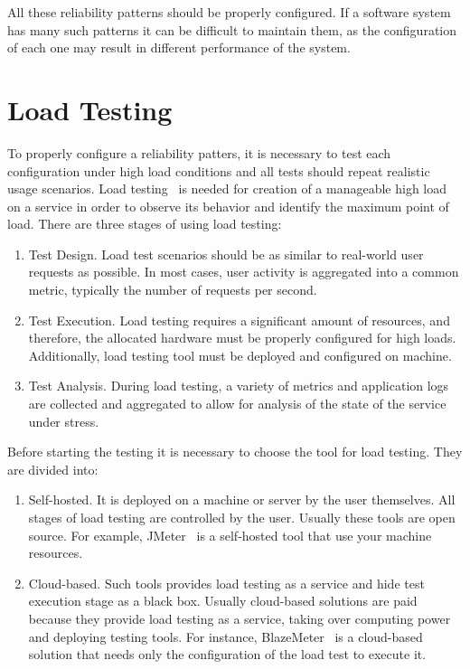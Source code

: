 All these reliability patterns should be properly configured. If a software system has many such patterns it can be difficult to maintain them, as the configuration of each one may result in different performance of the system.

\section{Load Testing}\label{sec:load-testing}
To properly configure a reliability patters, it is necessary to test each configuration under high load conditions and all tests should repeat realistic usage scenarios. Load testing~\cite{load_testing_tips} is needed for creation of a manageable high load on a service in order to observe its behavior and identify the maximum point of load. There are three stages of using load testing:

\begin{enumerate}
    \item Test Design. Load test scenarios should be as similar to real-world user requests as possible. In most cases, user activity is aggregated into a common metric, typically the number of requests per second.
    \item Test Execution. Load testing requires a significant amount of resources, and therefore, the allocated hardware must be properly configured for high loads. Additionally, load testing tool must be deployed and configured on machine.
    \item Test Analysis. During load testing, a variety of metrics and application logs are collected and aggregated to allow for analysis of the state of the service under stress.
\end{enumerate}

Before starting the testing it is necessary to choose the tool for load testing. They are divided into:
\begin{enumerate}
    \item Self-hosted. It is deployed on a machine or server by the user themselves. All stages of load testing are controlled by the user. Usually these tools are open source. For example, JMeter~\cite{jmeter} is a self-hosted tool that use your machine resources.
    \item Cloud-based. Such tools provides load testing as a service and hide test execution stage as a black box. Usually cloud-based solutions are paid because they provide load testing as a service, taking over computing power and deploying testing tools. For instance, BlazeMeter~\cite{blazemeter} is a cloud-based solution that needs only the configuration of the load test to execute it.
\end{enumerate}

